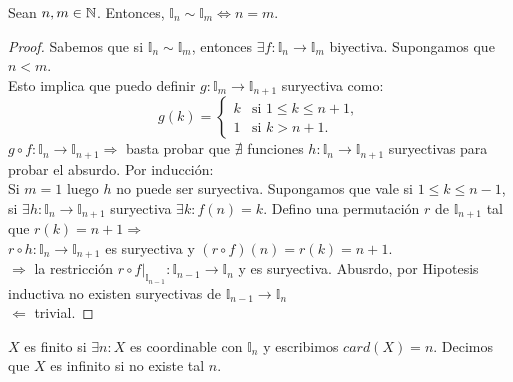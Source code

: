 \begin{theorem}
    Sean $n, m \in \mathbb{N}$. Entonces, $\mathbb{I}_n \sim \mathbb{I}_m \iff n = m$.
    \begin{proof}
        Sabemos que si $\mathbb{I}_n \sim \mathbb{I}_m$, entonces $\exists f: \mathbb{I}_n \to \mathbb{I}_m$ biyectiva. Supongamos que $n < m$. \\
        Esto implica que puedo definir $g: \mathbb{I}_m \to \mathbb{I}_{n+1}$ suryectiva como:
        \[
        g(k) = 
        \begin{cases} 
            k & \text{si } 1 \leq k \leq n+1, \\
            1 & \text{si } k > n+1.
        \end{cases}
        \]
        $g \circ f: \mathbb{I}_n \to \mathbb{I}_{n+1} \Rightarrow$ basta probar que $\nexists$ funciones $h: \mathbb{I}_n \to \mathbb{I}_{n+1}$ suryectivas para probar el absurdo. 
        Por inducción: \\
        Si $m=1$ luego $h$ no puede ser suryectiva. Supongamos que vale si $1 \leq k \leq n-1$, si $\exists h: \mathbb{I}_n \to \mathbb{I}_{n+1}$ suryectiva $\exists k : f(n) = k$. Defino una permutación $r$ de $\mathbb{I}_{n+1}$ tal que $r(k) = n+1 \Rightarrow$ \\
        $r \circ h: \mathbb{I}_n \to \mathbb{I}_{n+1}$ es suryectiva y $(r \circ f)(n) = r(k) = n+1$. \\
        $\Rightarrow$ la restricción $r \circ f|_{\mathbb{I}_{n-1}}:\mathbb{I}_{n-1} \to \mathbb{I}_n$ y es suryectiva. Abusrdo, por Hipotesis inductiva no existen suryectivas de $\mathbb{I}_{n-1} \to \mathbb{I}_n$ \\

        $\Leftarrow$ trivial.
    \end{proof}
\end{theorem}

\begin{definition}
    $X$ es finito si $\exists n: X$ es coordinable con $\mathbb{I}_n$ y escribimos $card(X)=n$. Decimos que $X$ es infinito si no existe tal $n$.
\end{definition}
